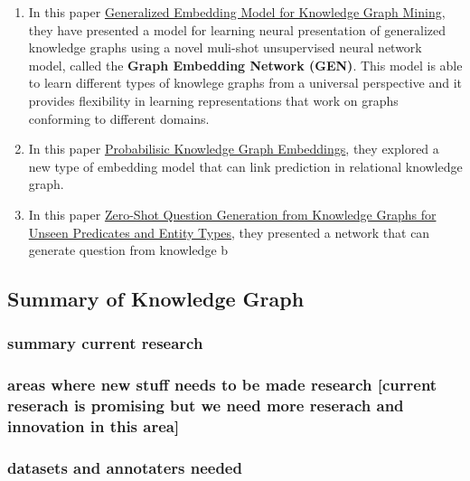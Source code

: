 \documentclass[]{book}
\theoremstyle{definition}
\theoremstyle{definition}
\theoremstyle{definition}
\theoremstyle{remark}
\begin{document}
\begin{enumerate}
\def\labelenumi{\arabic{enumi}.}
\item
  In this paper
  \href{http://www.mlgworkshop.org/2018/papers/MLG2018_paper_5.pdf}{Generalized
  Embedding Model for Knowledge Graph Mining}, they have presented a
  model for learning neural presentation of generalized knowledge graphs
  using a novel muli-shot unsupervised neural network model, called the
  \textbf{Graph Embedding Network (GEN)}. This model is able to learn
  different types of knowlege graphs from a universal perspective and it
  provides flexibility in learning representations that work on graphs
  conforming to different domains.
\item
  In this paper
  \href{https://openreview.net/pdf?id=rJ4qXnCqFX}{Probabilisic Knowledge
  Graph Embeddings}, they explored a new type of embedding model that
  can link prediction in relational knowledge graph.
\item
  In this paper \href{http://aclweb.org/anthology/N18-1020}{Zero-Shot
  Question Generation from Knowledge Graphs for Unseen Predicates and
  Entity Types}, they presented a network that can generate question
  from knowledge b
\end{enumerate}

\subsection{Summary of Knowledge
Graph}\label{summary-of-knowledge-graph}

\subsubsection{summary current
research}\label{summary-current-research-1}

\subsubsection{areas where new stuff needs to be made research
{[}current reserach is promising but we need more reserach and
innovation in this
area{]}}\label{areas-where-new-stuff-needs-to-be-made-research-current-reserach-is-promising-but-we-need-more-reserach-and-innovation-in-this-area-1}

\subsubsection{datasets and annotaters
needed}\label{datasets-and-annotaters-needed-1}
\end{document}
